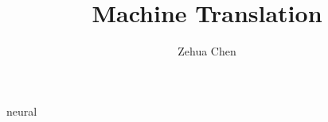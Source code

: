 \documentclass[11pt]{book}
\title{Machine Translation}
\author{Zehua Chen}
\begin{document}
  \maketitle
  \tableofcontents

  {neural}
\end{document}
